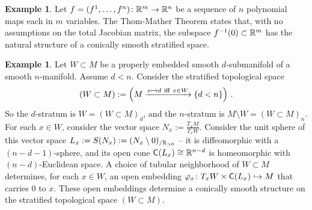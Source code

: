 \documentclass{article}
\newcommand{\xra}{\xrightarrow}
\theoremstyle{definition}
\newtheorem{example}[theorem]{Example}
\begin{document}
\begin{example}
Let $f=(f^1,\dots,f^n)\colon \mathbb R^m \to \mathbb R^n$ be a sequence of $n$ polynomial maps each in $m$ variables.  
The Thom-Mather Theorem \cite{mather} states that, with no assumptions on the total Jacobian matrix, the subspace $f^{-1}(0) \subset \mathbb R^m$ has the natural structure of a conically smooth stratified space.  
\end{example}

\begin{example}\label{r1}
Let $W\subset M$ be a properly embedded smooth $d$-submanifold of a smooth $n$-manifold.
Assume $d<n$.  
Consider the stratified topological space 
\[
(W\subset M) := \Bigl( M \xra{x\mapsto d ~\text{iff}~x\in W} \{d<n\} \Bigr)
~.
\]
So the $d$-stratum is $W = (W\subset M)_d$, and the $n$-stratum is $M\setminus W = (W\subset M)_n$.  
For each $x\in W$, consider the vector space $N_x:=\frac{T_x M}{T_x W}$.
Consider the unit sphere of this vector space $L_x := S(N_x) := ( N_x \setminus 0 )_{/\mathbb R_{>0}}$ -- it is diffeomorphic with a $(n-d-1)$-sphere, and its open cone $\mathsf C(L_x) \cong \mathbb R^{n-d}$ is homeomorphic with $(n-d)$-Euclidean space.   
A choice of tubular neighborhood of $W\subset M$ determines, for each $x\in W$, an open embedding $\varphi_x \colon T_x W \times \mathsf C(L_x) \hookrightarrow M$ that carries $0$ to $x$.  
These open embeddings determine a conically smooth structure on the stratified topological space $(W\subset M)$.  
\end{example}
\end{document}
